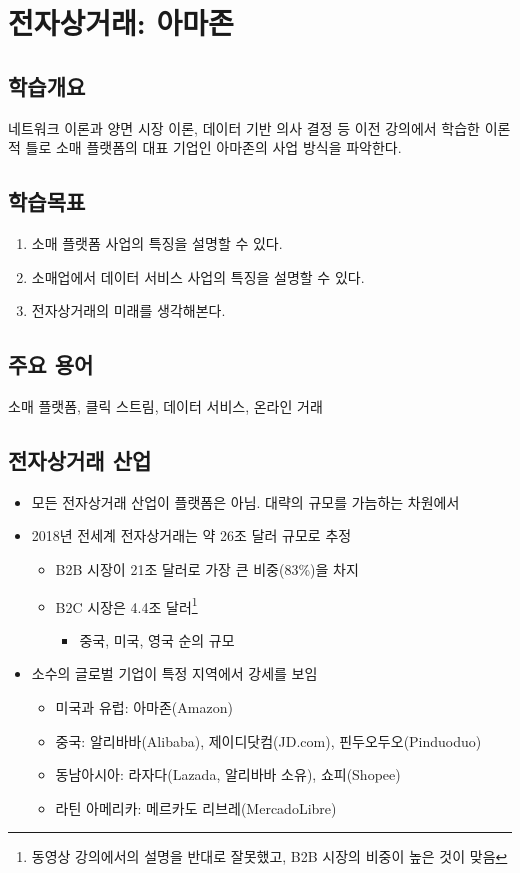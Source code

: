 \chapter{전자상거래: 아마존}\label{cha:ecommerce}

\section*{학습개요}
네트워크 이론과 양면 시장 이론, 데이터 기반 의사 결정 등 이전 강의에서 학습한 이론적 틀로 소매 플랫폼의 대표 기업인 아마존의 사업 방식을 파악한다. 

\section*{학습목표}
\begin{enumerate}
\item 소매 플랫폼 사업의 특징을 설명할 수 있다.
\item 소매업에서 데이터 서비스 사업의 특징을 설명할 수 있다.
\item 전자상거래의 미래를 생각해본다.
\end{enumerate}

\section*{주요 용어}
소매 플랫폼, 클릭 스트림, 데이터 서비스, 온라인 거래

\pagebreak

\section{전자상거래 산업}\label{sec:ecommerce}
\begin{itemize}
\item 모든 전자상거래 산업이 플랫폼은 아님. 대략의 규모를 가늠하는 차원에서
\item 2018년 전세계 전자상거래는 약 26조 달러 규모로 추정 \citep{UNCTAD:2021wk}
	\begin{itemize}
	\item B2B 시장이 21조 달러로 가장 큰 비중(83\%)을 차지
	\item B2C 시장은 4.4조 달러\footnote{동영상 강의에서의 설명을 반대로 잘못했고, B2B 시장의 비중이 높은 것이 맞음}
		\begin{itemize}
		\item 중국, 미국, 영국 순의 규모
		\end{itemize}
	\end{itemize}
\item 소수의 글로벌 기업이 특정 지역에서 강세를 보임
	\begin{itemize}
	\item 미국과 유럽: 아마존(Amazon)
	\item 중국: 알리바바(Alibaba), 제이디닷컴(JD.com), 핀두오두오(Pinduoduo)
	\item 동남아시아: 라자다(Lazada, 알리바바 소유), 쇼피(Shopee)
	\item 라틴 아메리카: 메르카도 리브레(MercadoLibre)
	\end{itemize}
\end{itemize}

